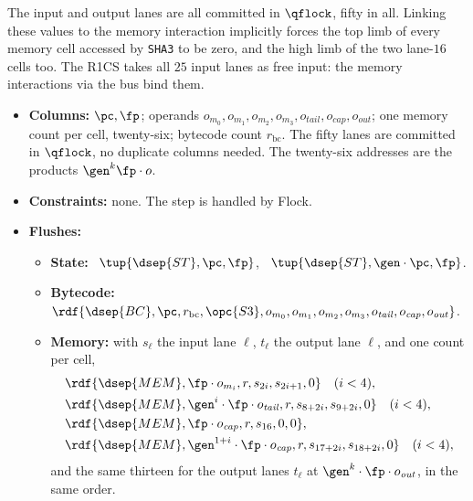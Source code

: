 The input and output lanes are all committed in $\qflock$, fifty in all. Linking these values to the memory interaction implicitly forces the top limb of every memory cell accessed by \texttt{SHA3} to be zero, and the high limb of the two lane-$16$ cells too. The R1CS takes all $25$ input lanes as free input: the memory interactions via the bus bind them.
\begin{itemize}
\item \textbf{Columns:} $\pc,\fp$; operands $o_{m_0},o_{m_1},o_{m_2},o_{m_3},o_{\mathit{tail}},o_{\mathit{cap}},o_{\mathit{out}}$; one memory count per cell, twenty-six; bytecode count $r_{\mathrm{bc}}$. The fifty lanes are committed in $\qflock$, no duplicate columns needed. The twenty-six addresses are the products $\gen^{k}\fp\cdot o$.
\item \textbf{Constraints:} none. The step is handled by Flock.
\item \textbf{Flushes:}
  \begin{itemize}
  \item \textbf{State:} \pull\ $\tup{\dsep{ST},\pc,\fp}$, \push\ $\tup{\dsep{ST},\gen\cdot\pc,\fp}$.
  \item \textbf{Bytecode:} $\rdf{\dsep{BC},\pc,r_{\mathrm{bc}},\opc{S3},o_{m_0},o_{m_1},o_{m_2},o_{m_3},o_{\mathit{tail}},o_{\mathit{cap}},o_{\mathit{out}}}$.
  \item \textbf{Memory:} with $s_\ell$ the input lane $\ell$, $t_\ell$ the output lane $\ell$, and one count per cell,
    \begin{align*}
      &\rdf{\dsep{MEM},\fp\cdot o_{m_i},r,s_{2i},s_{2i+1},0}\quad(i<4),\\
      &\rdf{\dsep{MEM},\gen^{i}\cdot\fp\cdot o_{\mathit{tail}},r,s_{8+2i},s_{9+2i},0}\quad(i<4),\\
      &\rdf{\dsep{MEM},\fp\cdot o_{\mathit{cap}},r,s_{16},0,0},\\
      &\rdf{\dsep{MEM},\gen^{1+i}\cdot\fp\cdot o_{\mathit{cap}},r,s_{17+2i},s_{18+2i},0}\quad(i<4),
    \end{align*}
    and the same thirteen for the output lanes $t_\ell$ at $\gen^{k}\cdot\fp\cdot o_{\mathit{out}}$, in the same order.
  \end{itemize}
\end{itemize}
